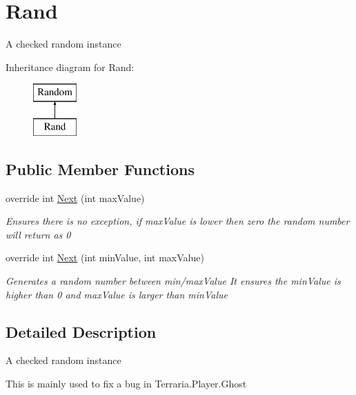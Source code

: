 \hypertarget{classOTA_1_1Callbacks_1_1Rand}{}\section{Rand}
\label{classOTA_1_1Callbacks_1_1Rand}


A checked random instance  


Inheritance diagram for Rand\+:\begin{figure}[H]
\begin{center}
\leavevmode
\includegraphics[height=2.000000cm]{classOTA_1_1Callbacks_1_1Rand}
\end{center}
\end{figure}
\subsection*{Public Member Functions}
\begin{DoxyCompactItemize}
\item 
override int \hyperlink{classOTA_1_1Callbacks_1_1Rand_aaeb8a8d8fba4da57db6b7dcdb2d30831}{Next} (int max\+Value)
\begin{DoxyCompactList}\small\item\em Ensures there is no exception, if max\+Value is lower then zero the random number will return as 0 \end{DoxyCompactList}\item 
override int \hyperlink{classOTA_1_1Callbacks_1_1Rand_a2a2a9d364365c3b86887dd9721aade3c}{Next} (int min\+Value, int max\+Value)
\begin{DoxyCompactList}\small\item\em Generates a random number between min/max\+Value It ensures the min\+Value is higher than 0 and max\+Value is larger than min\+Value \end{DoxyCompactList}\end{DoxyCompactItemize}


\subsection{Detailed Description}
A checked random instance 

This is mainly used to fix a bug in Terraria.\+Player.\+Ghost


